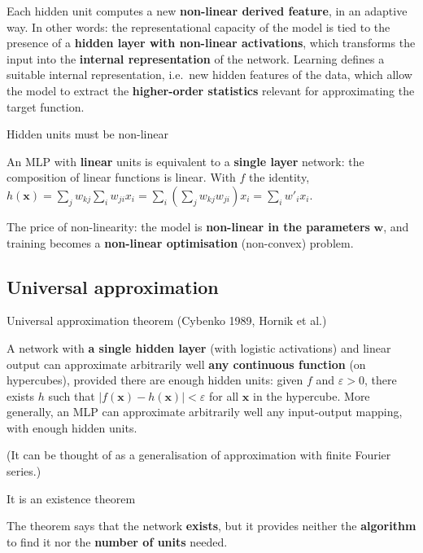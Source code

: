 Each hidden unit computes a new \textbf{non-linear derived feature}, in
an adaptive way. In other words: the representational capacity of the
model is tied to the presence of a \textbf{hidden layer with non-linear
activations}, which transforms the input into the \textbf{internal
representation} of the network. Learning defines a suitable internal
representation, i.e.\ new hidden features of the data, which allow the
model to extract the \textbf{higher-order statistics} relevant for
approximating the target function.

\begin{boxwarning}{Hidden units must be non-linear}

An MLP with \textbf{linear} units is equivalent to a \textbf{single
layer} network: the composition of linear functions is linear. With
\(f\) the identity,
\(h(\mathbf{x}) = \sum_j w_{kj}\sum_i w_{ji}x_i = \sum_i\left(\sum_j w_{kj}w_{ji}\right)x_i = \sum_i w'_i x_i\).

The price of non-linearity: the model is \textbf{non-linear in the
parameters} \(\mathbf{w}\), and training becomes a \textbf{non-linear
optimisation} (non-convex) problem.

\end{boxwarning}

\subsection{Universal
approximation}\label{lapprossimazione-universale}

\begin{boxtheorem}{Universal approximation theorem (Cybenko 1989, Hornik et al.)}

A network with \textbf{a single hidden layer} (with logistic
activations) and linear output can approximate arbitrarily well
\textbf{any continuous function} (on hypercubes), provided there are
enough hidden units: given \(f\) and \(\varepsilon > 0\), there exists
\(h\) such that \(|f(\mathbf{x}) - h(\mathbf{x})| < \varepsilon\) for
all \(\mathbf{x}\) in the hypercube. More generally, an MLP can
approximate arbitrarily well any input-output mapping, with enough
hidden units.

\end{boxtheorem}

(It can be thought of as a generalisation of approximation with finite
Fourier series.)

\begin{boxwarning}{It is an existence theorem}

The theorem says that the network \textbf{exists}, but it provides
neither the \textbf{algorithm} to find it nor the \textbf{number of
units} needed.

\end{boxwarning}

